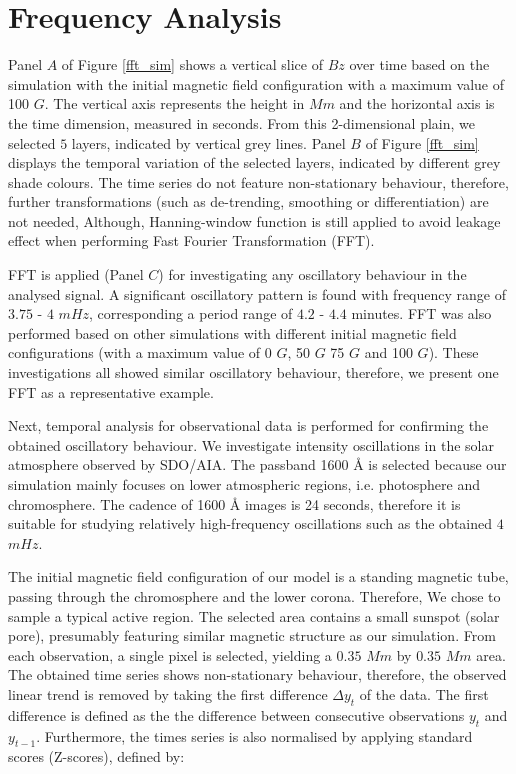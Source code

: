 \documentclass[twocolumn]{aastex62}
\begin{document}
\section{Frequency Analysis}

Panel $A$ of Figure \ref{fft_sim} shows a vertical slice of $Bz$ over time based on the simulation with the initial magnetic field configuration with a maximum value of 100 $G$. The vertical axis represents the height in $Mm$ and the horizontal axis is the time dimension, measured in seconds. From this 2-dimensional plain, we selected $5$ layers, indicated by vertical grey lines. Panel $B$ of Figure \ref{fft_sim} displays the temporal variation of the selected layers, indicated by different grey shade colours. The time series do not feature non-stationary behaviour, therefore, further transformations (such as de-trending, smoothing or differentiation) are not needed, Although, Hanning-window function is still applied to avoid leakage effect when performing Fast Fourier Transformation (FFT).  

FFT is applied (Panel $C$) for investigating any oscillatory behaviour in the analysed signal. A significant oscillatory pattern is found with frequency range of $3.75$ - $4$ $mHz$, corresponding a period range of $4.2$ - $4.4$ minutes. FFT was also performed based on other simulations with different initial magnetic field configurations (with a maximum value of 0 $G$, 50 $G$ 75 $G$ and 100 $G$). These investigations all showed similar oscillatory behaviour, therefore, we present one FFT as a representative example. 

Next, temporal analysis for observational data is performed for confirming the obtained oscillatory behaviour. We investigate intensity oscillations in the solar atmosphere observed by SDO/AIA. The passband 1600 {\AA} is selected because our simulation mainly focuses on lower atmospheric regions, i.e. photosphere and chromosphere. The cadence of 1600 {\AA} images is 24 seconds, therefore it is suitable for studying relatively high-frequency oscillations such as the obtained $4$ $mHz$.

The initial magnetic field configuration of our model is a standing magnetic tube, passing through the chromosphere and the lower corona. Therefore, We chose to sample a typical active region. The selected area contains a small sunspot (solar pore), presumably featuring similar magnetic structure as our simulation. From each observation, a single pixel is selected, yielding a $0.35$ $Mm$ by $0.35$ $Mm$ area. The obtained time series shows non-stationary behaviour, therefore, the observed linear trend is removed by taking the first difference $\Delta  y_{t}$ of the data. The first difference is defined as the the difference between consecutive observations $y_{t}$ and $y_{t-1}$. Furthermore, the times series is also normalised by applying standard scores (Z-scores), defined by:
\end{document}
